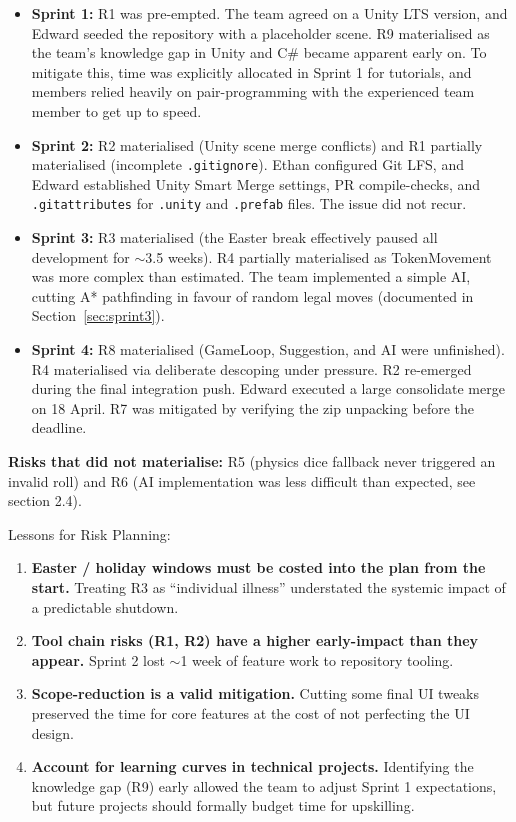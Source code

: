 \begin{itemize}
    \item \textbf{Sprint 1:} R1 was pre-empted. The team agreed on a Unity LTS version, and Edward seeded the repository with a placeholder scene. R9 materialised as the team's knowledge gap in Unity and C\# became apparent early on. To mitigate this, time was explicitly allocated in Sprint 1 for tutorials, and members relied heavily on pair-programming with the experienced team member to get up to speed.
    \item \textbf{Sprint 2:} R2 materialised (Unity scene merge conflicts) and R1 partially materialised (incomplete \texttt{.gitignore}). Ethan configured Git LFS, and Edward established Unity Smart Merge settings, PR compile-checks, and \texttt{.gitattributes} for \texttt{.unity} and \texttt{.prefab} files. The issue did not recur.
    \item \textbf{Sprint 3:} R3 materialised (the Easter break effectively paused all development for $\sim$3.5 weeks). R4 partially materialised as TokenMovement was more complex than estimated. The team implemented a simple AI, cutting A* pathfinding in favour of random legal moves (documented in Section~\ref{sec:sprint3}).
    \item \textbf{Sprint 4:} R8 materialised (GameLoop, Suggestion, and AI were unfinished). R4 materialised via deliberate descoping under pressure. R2 re-emerged during the final integration push. Edward executed a large consolidate merge on 18 April. R7 was mitigated by verifying the zip unpacking before the deadline.
\end{itemize}

\textbf{Risks that did not materialise:}
R5 (physics dice fallback never triggered an invalid roll) and R6 (AI implementation was less difficult than expected, see section 2.4).

Lessons for Risk Planning:
\begin{enumerate}
    \item \textbf{Easter / holiday windows must be costed into the plan from the start.} Treating R3 as ``individual illness'' understated the systemic impact of a predictable shutdown.
    \item \textbf{Tool chain risks (R1, R2) have a higher early-impact than they appear.} Sprint 2 lost $\sim$1 week of feature work to repository tooling.
    \item \textbf{Scope-reduction is a valid mitigation.} Cutting some final UI tweaks preserved the time for core features at the cost of not perfecting the UI design.
    \item \textbf{Account for learning curves in technical projects.} Identifying the knowledge gap (R9) early allowed the team to adjust Sprint 1 expectations, but future projects should formally budget time for upskilling.
\end{enumerate}

